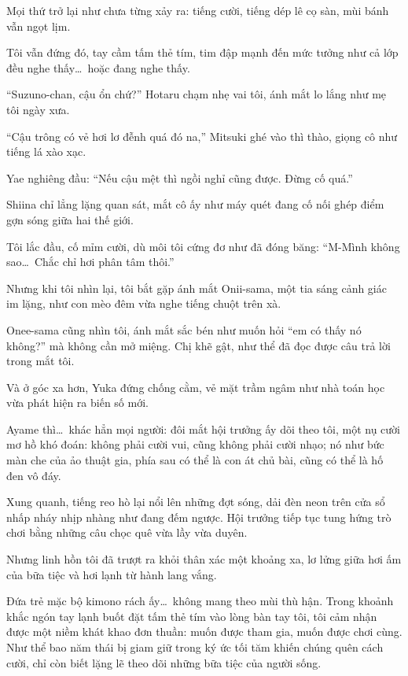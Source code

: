 \documentclass[../main.tex]{subfiles}
\begin{document}
Mọi thứ trở lại như chưa từng xảy ra: tiếng cười, tiếng dép lê cọ sàn, mùi bánh vẫn ngọt lịm.

Tôi vẫn đứng đó, tay cầm tấm thẻ tím, tim đập mạnh đến mức tưởng như cả lớp đều nghe thấy\dots\ hoặc đang nghe thấy.

``Suzuno-chan, cậu ổn chứ?'' Hotaru chạm nhẹ vai tôi, ánh mắt lo lắng như mẹ tôi ngày xưa.

``Cậu trông có vẻ hơi lơ đễnh quá đó na,'' Mitsuki ghé vào thì thào, giọng cô như tiếng lá xào xạc.

Yae nghiêng đầu: ``Nếu cậu mệt thì ngồi nghỉ cũng được. Đừng cố quá.''

Shiina chỉ lẳng lặng quan sát, mắt cô ấy như máy quét đang cố nối ghép điểm gợn sóng giữa hai thế giới.

Tôi lắc đầu, cố mỉm cười, dù môi tôi cứng đơ như đã đóng băng: ``M-Mình không sao\dots\ Chắc chỉ hơi phân tâm thôi.''

Nhưng khi tôi nhìn lại, tôi bắt gặp ánh mắt Onii-sama, một tia sáng cảnh giác im lặng, như con mèo đêm vừa nghe tiếng chuột trên xà.

Onee-sama cũng nhìn tôi, ánh mắt sắc bén như muốn hỏi ``em có thấy nó không?'' mà không cần mở miệng. Chị khẽ gật, như thể đã đọc được câu trả lời trong mắt tôi.

Và ở góc xa hơn, Yuka đứng chống cằm, vẻ mặt trầm ngâm như nhà toán học vừa phát hiện ra biến số mới.

Ayame thì\dots\ khác hẳn mọi người: đôi mắt hội trưởng ấy dõi theo tôi, một nụ cười mơ hồ khó đoán: không phải cười vui, cũng không phải cười nhạo; nó như bức màn che của ảo thuật gia, phía sau có thể là con át chủ bài, cũng có thể là hố đen vô đáy.

Xung quanh, tiếng reo hò lại nổi lên những đợt sóng, dải đèn neon trên cửa sổ nhấp nháy nhịp nhàng như đang đếm ngược. Hội trưởng tiếp tục tung hứng trò chơi bằng những câu chọc quê vừa lầy vừa duyên.

Nhưng linh hồn tôi đã trượt ra khỏi thân xác một khoảng xa, lơ lửng giữa hơi ấm của bữa tiệc và hơi lạnh từ hành lang vắng.

Đứa trẻ mặc bộ kimono rách ấy\dots\ không mang theo mùi thù hận. Trong khoảnh khắc ngón tay lạnh buốt đặt tấm thẻ tím vào lòng bàn tay tôi, tôi cảm nhận được một niềm khát khao đơn thuần: muốn được tham gia, muốn được chơi cùng. Như thể bao năm thái bị giam giữ trong ký ức tối tăm khiến chúng quên cách cười, chỉ còn biết lặng lẽ theo dõi những bữa tiệc của người sống.
\end{document}

